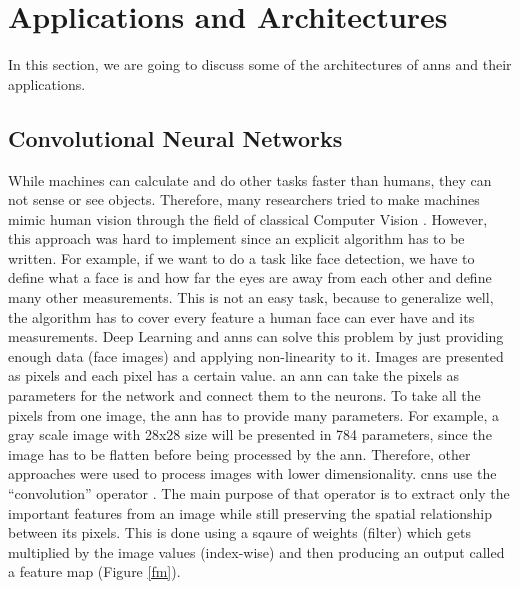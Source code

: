 \documentclass[runningheads]{llncs}
\begin{document}
\section{Applications and Architectures}

In this section, we are going to discuss some of the architectures of \gls{anns}
and their applications.

\subsection{Convolutional Neural Networks}

While machines can calculate and do other tasks faster than humans,
they can not sense or see objects. Therefore, many researchers
tried to make machines mimic human vision through the field of classical Computer Vision \cite{hoffmann1992computer}.
However, this approach was hard to implement since an explicit algorithm 
has to be written. For example, if we want to do a task like
face detection, we have to define what a face is and how
far the eyes are away from each other and define many other measurements. This is not 
an easy task, because to generalize well, the algorithm has to 
cover every feature a human face can ever have and its measurements. Deep Learning 
and \gls{anns} can solve this problem by just providing enough data
(face images) and applying non-linearity to it.
Images are presented as pixels and each pixel has a certain value.
an \gls{ann} can take the pixels as parameters for the network 
and connect them to the neurons. To take all the pixels from
one image, the \gls{ann} has to provide many parameters. For example,
a gray scale image with 28x28 size will be presented in 784 parameters, 
since the image has to be flatten before being processed by the \gls{ann}.
Therefore, other approaches were used to process images with lower dimensionality.
\gls{cnns} use the “convolution” operator \cite{lecun1998gradient}. The main purpose of that 
operator is to extract only the important features from an image while
still preserving the spatial relationship between its pixels. This is 
done using a sqaure of weights (filter) which
gets multiplied by the image values (index-wise) and then producing an output called a feature map (Figure \ref{fm}).
\end{document}
